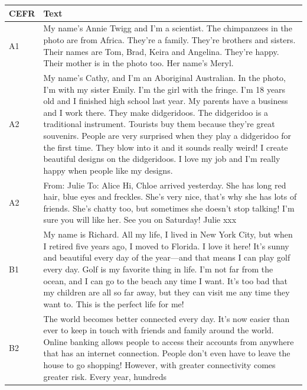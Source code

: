 \documentclass[11pt,a4paper]{article}
\begin{document}
\begin{longtable}{l|p{}}
  \toprule
  CEFR & Text\\
  \midrule
  A1 & My name's Annie Twigg and I'm a scientist. The chimpanzees in the photo are
  from Africa. They're a family. They're brothers and sisters. Their names
  are Tom, Brad, Keira and Angelina. They're happy. Their mother is in the
  photo too. Her name’s Meryl.\\
  \midrule
  A2 & My name's Cathy, and I'm an Aboriginal Australian. In the photo, I'm
  with my sister Emily. I'm the girl with the fringe. I'm 18 years old and I
  finished high school last year. My parents have a business and I work there.
  They make didgeridoos. The didgeridoo is a traditional instrument. Tourists
  buy them because they're great souvenirs. People are very surprised when they
  play a didgeridoo for the first time. They blow into it and it sounds really
  weird! I create beautiful designs on the didgeridoos. I love my job and I'm
  really happy when people like my designs.\\
  \midrule
  A2 & From: Julie\newline
  To: Alice\newline
  Hi,\newline
  Chloe arrived yesterday. She has long red hair, blue eyes and freckles. She's
  very nice, that's why she has lots of friends. She's chatty too, but
  sometimes she doesn't stop talking! I'm sure you will like her.\newline
  See you on Saturday!\newline
  Julie\newline
  xxx\\
  \midrule
  B1 & My name is Richard. All my life, I lived in New York City, but when I
  retired five years ago, I moved to Florida. I love it here! It’s sunny and
  beautiful every day of the year—and that means I can play golf every day.
  Golf is my favorite thing in life. I'm not far from the ocean, and I can go
  to the beach any time I want. It’s too bad that my children are all so far
  away, but they can visit me any time they want to. This is the perfect life
  for me!\\
  \midrule
  B2 & The world becomes better connected every day. It’s now easier than ever
  to keep in touch with friends and family around the world. Online banking
  allows people to access their accounts from anywhere that has an internet
  connection. People don’t even have to leave the house to go shopping!
  However, with greater connectivity comes greater risk. Every year, hundreds

\end{longtable}
\end{document}
